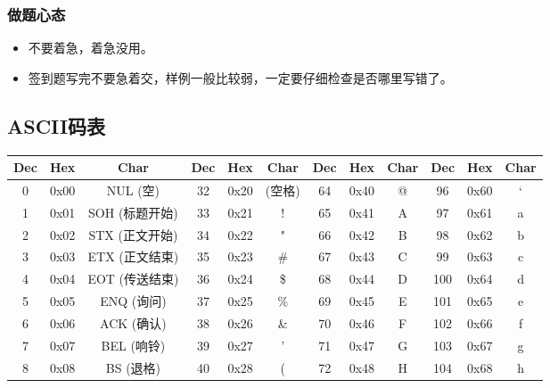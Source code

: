 \documentclass[a4paper, twoside]{article}
\begin{document}
    \subsubsection{做题心态}
    \begin{itemize}
        \item 不要着急，着急没用。
        \item 签到题写完不要急着交，样例一般比较弱，一定要仔细检查是否哪里写错了。
    \end{itemize}

\newpage
\subsection{ASCII码表}
\begin{table}[h]
    \centering
    \renewcommand{\arraystretch}{1.4}
    \setlength{\tabcolsep}{5pt}
    \begin{tabular}{|c c c|c c c|c c c|c c c|}
        \hline
        \textbf{Dec} & \textbf{Hex} & \textbf{Char} & \textbf{Dec} & \textbf{Hex} & \textbf{Char} & \textbf{Dec} & \textbf{Hex} & \textbf{Char} & \textbf{Dec} & \textbf{Hex} & \textbf{Char} \\
        \hline
            0  & 0x00 & NUL (空)          & 32  & 0x20 & (空格)     & 64  & 0x40 & @           &  96  & 0x60 & `            \\
            1  & 0x01 & SOH (标题开始)    & 33  & 0x21 & !          & 65  & 0x41 & A           &  97  & 0x61 & a            \\
            2  & 0x02 & STX (正文开始)    & 34  & 0x22 & "          & 66  & 0x42 & B           &  98  & 0x62 & b            \\
            3  & 0x03 & ETX (正文结束)    & 35  & 0x23 & \#         & 67  & 0x43 & C           &  99  & 0x63 & c            \\
            4  & 0x04 & EOT (传送结束)    & 36  & 0x24 & \$         & 68  & 0x44 & D           & 100  & 0x64 & d            \\
            5  & 0x05 & ENQ (询问)        & 37  & 0x25 & \%         & 69  & 0x45 & E           & 101  & 0x65 & e            \\
            6  & 0x06 & ACK (确认)        & 38  & 0x26 & \&         & 70  & 0x46 & F           & 102  & 0x66 & f            \\
            7  & 0x07 & BEL (响铃)        & 39  & 0x27 & '          & 71  & 0x47 & G           & 103  & 0x67 & g            \\
            8  & 0x08 & BS (退格)         & 40  & 0x28 & (          & 72  & 0x48 & H           & 104  & 0x68 & h            \\

\end{tabular}
\end{table}
\end{document}

